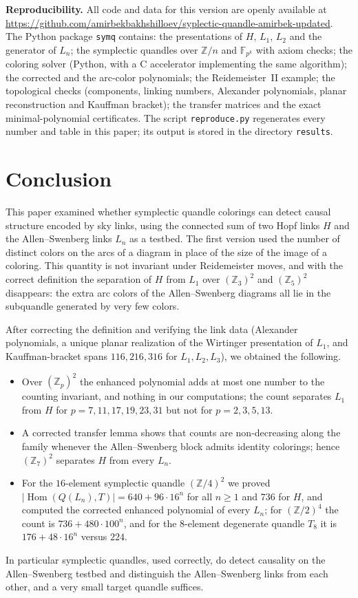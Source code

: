 \documentclass[11pt]{article}
\theoremstyle{definition}
\newcommand{\Z}{\mathbb{Z}}
\newcommand{\F}{\mathbb{F}}
\newcommand{\Hom}{\operatorname{Hom}}
\begin{document}
\medskip
{\sloppy
\noindent\textbf{Reproducibility.} All code and data for this version are openly available at
\url{https://github.com/amirbekbakhshilloev/syplectic-quandle-amirbek-updated}. The Python package
\texttt{symq} contains: the presentations of $H$, $L_1$, $L_2$ and the generator of $L_n$; the symplectic
quandles over $\Z/n$ and $\F_{p^k}$ with axiom checks; the coloring solver (Python, with a C accelerator
implementing the same algorithm); the corrected and the arc-color polynomials; the Reidemeister~II example;
the topological checks (components, linking numbers, Alexander polynomials, planar reconstruction and
Kauffman bracket); the transfer matrices and the exact minimal-polynomial certificates. The script
\texttt{reproduce.py} regenerates every number and table in this paper; its output is stored in the
directory \texttt{results}.\par}

\section{Conclusion}\label{sec:conclusion}

This paper examined whether symplectic quandle colorings can detect causal structure encoded by sky links,
using the connected sum of two Hopf links $H$ and the Allen--Swenberg links $L_n$ as a testbed. The first
version used the number of distinct colors on the arcs of a diagram in place of the size of the image of a
coloring. This quantity is not invariant under Reidemeister moves, and with the correct definition the
separation of $H$ from $L_1$ over $(\Z_3)^2$ and $(\Z_5)^2$ disappears: the extra arc colors of the
Allen--Swenberg diagrams all lie in the subquandle generated by very few colors.

After correcting the definition and verifying the link data (Alexander polynomials, a unique planar
realization of the Wirtinger presentation of $L_1$, and Kauffman-bracket spans $116,216,316$ for
$L_1,L_2,L_3$), we obtained the following.
\begin{itemize}
\item Over $(\Z_p)^2$ the enhanced polynomial adds at most one number to the counting invariant, and
nothing in our computations; the count separates $L_1$ from $H$ for $p=7,11,17,19,23,31$ but not for
$p=2,3,5,13$.
\item A corrected transfer lemma shows that counts are non-decreasing along the family whenever the
Allen--Swenberg block admits identity colorings; hence $(\Z_7)^2$ separates $H$ from every $L_n$.
\item For the $16$-element symplectic quandle $(\Z/4)^2$ we proved $|\Hom(Q(L_n),T)|=640+96\cdot16^n$ for all
$n\ge1$ and $736$ for $H$, and computed the corrected enhanced polynomial of every $L_n$; for $(\Z/2)^4$ the
count is $736+480\cdot100^n$, and for the $8$-element degenerate quandle $T_8$ it is $176+48\cdot16^n$
versus $224$.
\end{itemize}
In particular symplectic quandles, used correctly, do detect causality on the Allen--Swenberg testbed and
distinguish the Allen--Swenberg links from each other, and a very small target quandle suffices.
\end{document}
